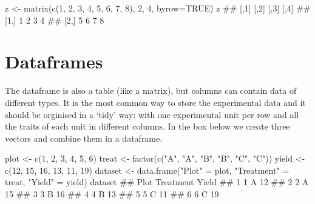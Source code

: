 \documentclass[a4paper,12pt,oneside]{book}
\newenvironment{Shaded}{\begin{snugshade}}{\end{snugshade}}
\newcommand{\DecValTok}[1]{#1}
\newcommand{\ConstantTok}[1]{#1}
\newcommand{\StringTok}[1]{#1}
\newcommand{\DocumentationTok}[1]{#1}
\newcommand{\OtherTok}[1]{#1}
\newcommand{\FunctionTok}[1]{#1}
\newcommand{\AttributeTok}[1]{#1}
\newcommand{\NormalTok}[1]{#1}
\begin{document}
\begin{Shaded}
\begin{Highlighting}[]
\NormalTok{z  }\OtherTok{\textless{}{-}}  \FunctionTok{matrix}\NormalTok{(}\FunctionTok{c}\NormalTok{(}\DecValTok{1}\NormalTok{, }\DecValTok{2}\NormalTok{, }\DecValTok{3}\NormalTok{, }\DecValTok{4}\NormalTok{, }\DecValTok{5}\NormalTok{, }\DecValTok{6}\NormalTok{, }\DecValTok{7}\NormalTok{, }\DecValTok{8}\NormalTok{),}
              \DecValTok{2}\NormalTok{, }\DecValTok{4}\NormalTok{, }\AttributeTok{byrow=}\ConstantTok{TRUE}\NormalTok{)}
\NormalTok{z}
\DocumentationTok{\#\#      [,1] [,2] [,3] [,4]}
\DocumentationTok{\#\# [1,]    1    2    3    4}
\DocumentationTok{\#\# [2,]    5    6    7    8}
\end{Highlighting}
\end{Shaded}

\hypertarget{dataframes}{%
\section{Dataframes}\label{dataframes}}

The dataframe is also a table (like a matrix), but columns can contain data of different types. It is the most common way to store the experimental data and it should be orginised in a `tidy' way: with one experimental unit per row and all the traits of each unit in different columns. In the box below we create three vectors and combine them in a dataframe.

\scriptsize

\begin{Shaded}
\begin{Highlighting}[]
\NormalTok{plot  }\OtherTok{\textless{}{-}}  \FunctionTok{c}\NormalTok{(}\DecValTok{1}\NormalTok{, }\DecValTok{2}\NormalTok{, }\DecValTok{3}\NormalTok{, }\DecValTok{4}\NormalTok{, }\DecValTok{5}\NormalTok{, }\DecValTok{6}\NormalTok{)}
\NormalTok{treat  }\OtherTok{\textless{}{-}}  \FunctionTok{factor}\NormalTok{(}\FunctionTok{c}\NormalTok{(}\StringTok{"A"}\NormalTok{, }\StringTok{"A"}\NormalTok{, }\StringTok{"B"}\NormalTok{, }\StringTok{"B"}\NormalTok{, }\StringTok{"C"}\NormalTok{, }\StringTok{"C"}\NormalTok{))}
\NormalTok{yield  }\OtherTok{\textless{}{-}}  \FunctionTok{c}\NormalTok{(}\DecValTok{12}\NormalTok{, }\DecValTok{15}\NormalTok{, }\DecValTok{16}\NormalTok{, }\DecValTok{13}\NormalTok{, }\DecValTok{11}\NormalTok{, }\DecValTok{19}\NormalTok{)}
\NormalTok{dataset  }\OtherTok{\textless{}{-}}  \FunctionTok{data.frame}\NormalTok{(}\StringTok{"Plot"} \OtherTok{=}\NormalTok{ plot,}
  \StringTok{"Treatment"} \OtherTok{=}\NormalTok{ treat, }\StringTok{"Yield"} \OtherTok{=}\NormalTok{ yield)}
\NormalTok{dataset}
\DocumentationTok{\#\#   Plot Treatment Yield}
\DocumentationTok{\#\# 1    1         A    12}
\DocumentationTok{\#\# 2    2         A    15}
\DocumentationTok{\#\# 3    3         B    16}
\DocumentationTok{\#\# 4    4         B    13}
\DocumentationTok{\#\# 5    5         C    11}
\DocumentationTok{\#\# 6    6         C    19}
\end{Highlighting}
\end{Shaded}
\end{document}
